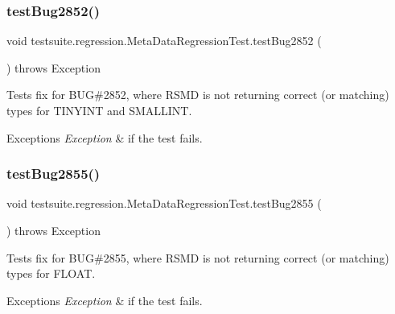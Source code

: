 \subsubsection{\texorpdfstring{test\+Bug2852()}{testBug2852()}}
{\footnotesize\ttfamily void testsuite.\+regression.\+Meta\+Data\+Regression\+Test.\+test\+Bug2852 (\begin{DoxyParamCaption}{ }\end{DoxyParamCaption}) throws Exception}

Tests fix for B\+UG\#2852, where R\+S\+MD is not returning correct (or matching) types for T\+I\+N\+Y\+I\+NT and S\+M\+A\+L\+L\+I\+NT.


\begin{DoxyExceptions}{Exceptions}
{\em Exception} & if the test fails. \\
\hline
\end{DoxyExceptions}
\mbox{\label{classtestsuite_1_1regression_1_1_meta_data_regression_test_a7575c81c706f7b3eb33eafce244b371a}} 
\subsubsection{\texorpdfstring{test\+Bug2855()}{testBug2855()}}
{\footnotesize\ttfamily void testsuite.\+regression.\+Meta\+Data\+Regression\+Test.\+test\+Bug2855 (\begin{DoxyParamCaption}{ }\end{DoxyParamCaption}) throws Exception}

Tests fix for B\+UG\#2855, where R\+S\+MD is not returning correct (or matching) types for F\+L\+O\+AT.


\begin{DoxyExceptions}{Exceptions}
{\em Exception} & if the test fails. \\
\hline
\end{DoxyExceptions}
\mbox{\label{classtestsuite_1_1regression_1_1_meta_data_regression_test_ae11afffc667500d79aec8b585ccd51a5}} 
